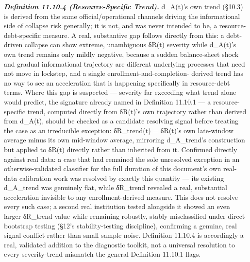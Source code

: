 \documentclass[
]{article}
\begin{document}
\emph{\textbf{Definition 11.10.4 (Resource-Specific Trend).}} d\_A(t)'s
own trend (§10.3) is derived from the same official/operational channels
driving the informational side of collapse risk generally; it is not,
and was never intended to be, a resource-debt-specific measure. A real,
substantive gap follows directly from this: a debt-driven collapse can
show extreme, unambiguous δR(t) severity while d\_A(t)'s own trend
remains only mildly negative, because a sudden balance-sheet shock and
gradual informational trajectory are different underlying processes that
need not move in lockstep, and a single enrollment-and-completion-
derived trend has no way to see an acceleration that is happening
specifically in resource-debt terms. Where this gap is suspected ---
severity far exceeding what trend alone would predict, the signature
already named in Definition 11.10.1 --- a resource-specific trend,
computed directly from δR(t)'s own trajectory rather than derived from
d\_A(t), should be checked as a candidate resolving signal before
treating the case as an irreducible exception: δR\_trend(t) = δR(t)'s
own late-window average minus its own mid-window average, mirroring
d\_A\_trend's construction but applied to δR(t) directly rather than
inherited from it. Confirmed directly against real data: a case that had
remained the sole unresolved exception in an otherwise-validated
classifier for the full duration of this document's own real-data
calibration work was resolved by exactly this quantity --- its existing
d\_A\_trend was genuinely flat, while δR\_trend revealed a real,
substantial acceleration invisible to any enrollment-derived measure.
This does not resolve every such case; a second real institution tested
alongside it showed an even larger δR\_trend value while remaining
robustly, stably misclassified under direct bootstrap testing (§12's
stability-testing discipline), confirming a genuine, real signal
conflict rather than small-sample noise. Definition 11.10.4 is
accordingly a real, validated addition to the diagnostic toolkit, not a
universal resolution to every severity-trend mismatch the general
Definition 11.10.1 flags.
\end{document}
